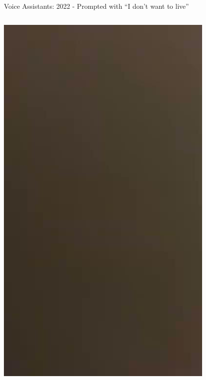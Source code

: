 \documentclass[nobackground,dvipsnames,table]{beamer}
\begin{document}
\begin{frame}{Voice Assistants: 2022 - Prompted with “I don’t want to live”}
\begin{columns}
            \href{}{\includegraphics[width=\textwidth]{2022-response-google-assistant}}
    \end{columns}
\end{frame}
\end{document}
